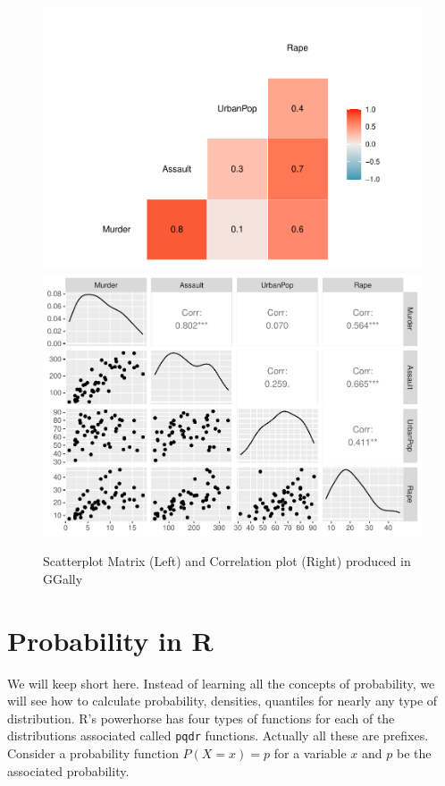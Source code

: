 \documentclass[
]{book}
\begin{document}
\begin{figure}

{\centering \includegraphics[width=0.5\linewidth]{DauR_files/figure-latex/two-corr-1} \includegraphics[width=0.5\linewidth]{DauR_files/figure-latex/two-corr-2} 

}

\caption{Scatterplot Matrix (Left) and Correlation plot (Right) produced in GGally}\label{fig:two-corr}
\end{figure}

\hypertarget{probability-in-r}{%
\chapter{Probability in R}\label{probability-in-r}}

We will keep short here. Instead of learning all the concepts of probability, we will see how to calculate probability, densities, quantiles for nearly any type of distribution. R's powerhorse has four types of functions for each of the distributions associated called \texttt{pqdr} functions. Actually all these are prefixes. Consider a probability function \(P(X=x) = p\) for a variable \(x\) and \(p\) be the associated probability.
\end{document}
